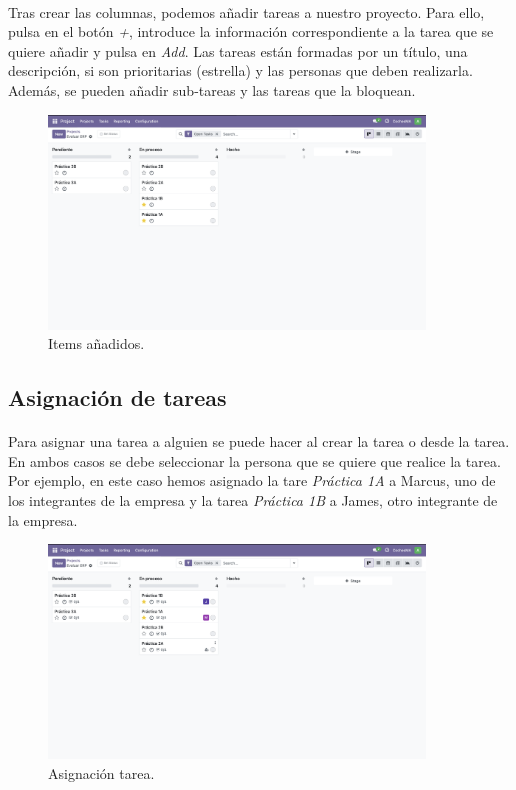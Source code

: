 \documentclass[paper=a4wide, fontsize=11pt]{report}	 %
\begin{document}
\paragraph{}
Tras crear las columnas, podemos añadir tareas a nuestro proyecto. Para ello, pulsa en el botón \textit{+}, introduce la información correspondiente a la tarea que se quiere añadir y pulsa en \textit{Add}. Las tareas están formadas por un título, una descripción, si son prioritarias (estrella) y las personas que deben realizarla. Además, se pueden añadir sub-tareas y las tareas que la bloquean.
\begin{figure}[h]
    \centering
    \includegraphics[width=10cm]{itemsAddedProject.png}
    \caption{Items añadidos.}
    \label{fig:openProyectos}
\end{figure}
\newpage
\subsection{Asignación de tareas}
\paragraph{}
Para asignar una tarea a alguien se puede hacer al crear la tarea o desde la tarea. En ambos casos se debe seleccionar la persona que se quiere que realice la tarea. Por ejemplo, en este caso hemos asignado la tare \textit{Práctica 1A} a Marcus, uno de los integrantes de la empresa y la tarea \textit{Práctica 1B} a James, otro integrante de la empresa.
\begin{figure}[h]
    \centering
    \includegraphics[width=10cm]{assignProject.png}
    \caption{Asignación tarea.}
    \label{fig:openProyectos}
\end{figure}
\newpage
\end{document}
